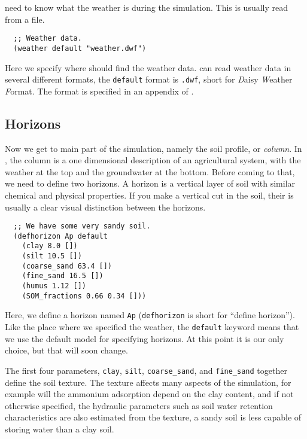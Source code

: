 \documentclass[a4paper,11pt]{article}
\begin{document}
\Daisy{} need to know what the weather is during the simulation.  This
is usually read from a file.

\begin{verbatim}
  ;; Weather data.
  (weather default "weather.dwf")
\end{verbatim}

Here we specify where \daisy{} should find the weather data.  \Daisy{}
can read weather data in several different formats, the
\texttt{default} format is \texttt{.dwf}, short for \emph{D}aisy
\emph{W}eather \emph{F}ormat.  The format is specified in an appendix
 of \cite{dina81}.

\subsection{Horizons}
\label{sec:ex-hor}

Now we get to main part of the simulation, namely the soil profile, or
\emph{column}.  In \daisy{}, the column is a one dimensional
description of an agricultural system, with the weather at the top and
the groundwater at the bottom.  Before coming to that, we need to
define two horizons.  A horizon is a vertical layer of soil with
similar chemical and physical properties.  If you make a vertical cut
in the soil, their is usually a clear visual distinction between the
horizons.

\begin{verbatim}
  ;; We have some very sandy soil.
  (defhorizon Ap default
    (clay 8.0 [])
    (silt 10.5 [])
    (coarse_sand 63.4 [])
    (fine_sand 16.5 [])
    (humus 1.12 [])
    (SOM_fractions 0.66 0.34 []))
\end{verbatim}

Here, we define a horizon named \texttt{Ap} (\texttt{defhorizon} is
short for ``define horizon'').  Like the place where we specified the
weather, the \texttt{default} keyword means that we use the default
model for specifying horizons.  At this point it is our only choice,
but that will soon change.

The first four parameters, \texttt{clay}, \texttt{silt},
\texttt{coarse\_sand}, and \texttt{fine\_sand} together define the
soil texture.  The texture affects many aspects of the simulation, for
example will the ammonium adsorption depend on the clay content, and
if not otherwise specified, the hydraulic parameters such as soil
water retention characteristics are also estimated from the texture, a
sandy soil is less capable of storing water than a clay soil.
\end{document}
